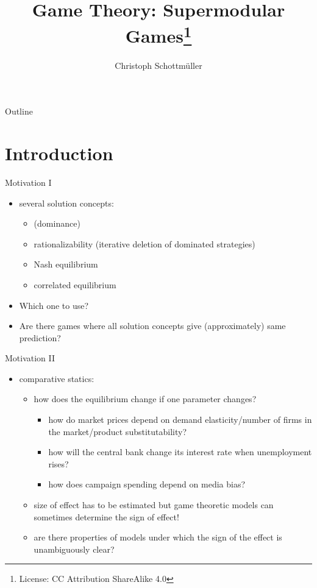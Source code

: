 \documentclass[bigger]{beamer}
\author{Christoph Schottmüller}
\date{}
\title{Game Theory: Supermodular Games\footnote{License: CC Attribution ShareAlike 4.0}}
\begin{document}
\maketitle
\begin{frame}{Outline}
\tableofcontents
\end{frame}




\section{Introduction}
\label{sec:orgheadline4}

\begin{frame}[label={sec:orgheadline1}]{Motivation I}
\begin{itemize}
\item several solution concepts:
\begin{itemize}
\item (dominance)
\item rationalizability (iterative deletion of dominated strategies)
\item Nash equilibrium
\item correlated equilibrium
\end{itemize}
\item Which one to use?
\item Are there games where all solution concepts give (approximately) same prediction?
\end{itemize}
\end{frame}

\begin{frame}[label={sec:orgheadline2}]{Motivation II}
\begin{itemize}
\item comparative statics:
\begin{itemize}
\item how does the equilibrium change if one parameter changes?
\begin{itemize}
\item how do market prices depend on demand elasticity/number of firms in the market/product substitutability?
\item how will the central bank change its interest rate when unemployment rises?
\item how does campaign spending depend on media bias?
\end{itemize}
\item size of effect has to be estimated but game theoretic models can sometimes determine the sign of effect!
\item are there properties of models under which the sign of the effect is unambiguously clear?
\end{itemize}
\end{itemize}
\end{frame}
\end{document}
